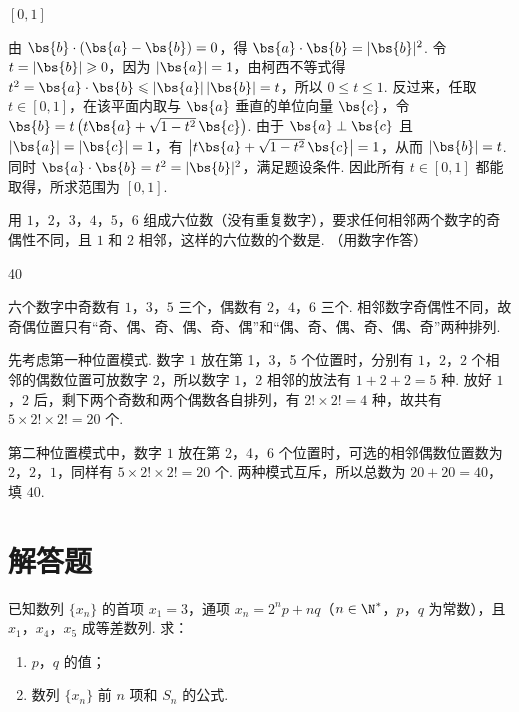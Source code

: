 \begin{answer}
\([0,1]\)
\end{answer}

\begin{solution}
由 \(\bs{b}\cdot(\bs{a}-\bs{b})=0\)，得 \(\bs{a}\cdot\bs{b}=|\bs{b}|^2\). 令 \(t=|\bs{b}|\geqslant0\)，因为 \(|\bs{a}|=1\)，由柯西不等式得 \(t^2=\bs{a}\cdot\bs{b}\leqslant|\bs{a}|\,|\bs{b}|=t\)，所以 \(0\leqslant t\leqslant1\). 反过来，任取 \(t\in[0,1]\)，在该平面内取与 \(\bs{a}\) 垂直的单位向量 \(\bs{c}\)，令 \(\bs{b}=t\left(t\bs{a}+\sqrt{1-t^2}\,\bs{c}\right)\). 由于 \(\bs{a}\perp\bs{c}\) 且 \(|\bs{a}|=|\bs{c}|=1\)，有 \(\left|t\bs{a}+\sqrt{1-t^2}\,\bs{c}\right|=1\)，从而 \(|\bs{b}|=t\). 同时 \(\bs{a}\cdot\bs{b}=t^2=|\bs{b}|^2\)，满足题设条件. 因此所有 \(t\in[0,1]\) 都能取得，所求范围为 \([0,1]\).
\end{solution}

\begin{problem}
用 \(1\)，\(2\)，\(3\)，\(4\)，\(5\)，\(6\) 组成六位数（没有重复数字），要求任何相邻两个数字的奇偶性不同，且 \(1\) 和 \(2\) 相邻，这样的六位数的个数是\fillinblank{}. （用数字作答）
\end{problem}

\begin{answer}
40
\end{answer}

\begin{solution}
六个数字中奇数有 \(1\)，\(3\)，\(5\) 三个，偶数有 \(2\)，\(4\)，\(6\) 三个. 相邻数字奇偶性不同，故奇偶位置只有“奇、偶、奇、偶、奇、偶”和“偶、奇、偶、奇、偶、奇”两种排列.

先考虑第一种位置模式. 数字 \(1\) 放在第 1，3，5 个位置时，分别有 \(1\)，\(2\)，\(2\) 个相邻的偶数位置可放数字 \(2\)，所以数字 \(1\)，\(2\) 相邻的放法有 \(1+2+2=5\) 种. 放好 \(1\)，\(2\) 后，剩下两个奇数和两个偶数各自排列，有 \(2!\times2!=4\) 种，故共有 \(5\times2!\times2!=20\) 个.

第二种位置模式中，数字 \(1\) 放在第 2，4，6 个位置时，可选的相邻偶数位置数为 \(2\)，\(2\)，\(1\)，同样有 \(5\times2!\times2!=20\) 个. 两种模式互斥，所以总数为 \(20+20=40\)，填 \(40\).
\end{solution}

\section{解答题}

\begin{problem}
已知数列 \(\{x_{n}\}\) 的首项 \(x_{1} = 3\)，通项 \(x_{n} = 2^{n}p + nq\)（\(n \in \N^{*}\)，\(p\)，\(q\) 为常数），且 \(x_{1}\)，\(x_{4}\)，\(x_{5}\) 成等差数列. 求：

\begin{enumerate}
\item \(p\)，\(q\) 的值；
\item 数列 \(\{x_{n}\}\) 前 \(n\) 项和 \(S_{n}\) 的公式.
\end{enumerate}
\end{problem}

